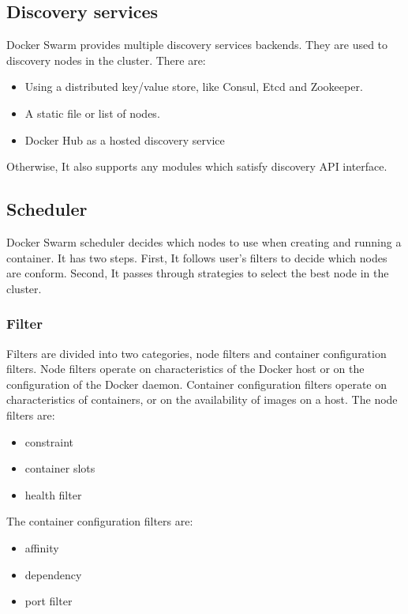 \subsection{Discovery services}
Docker Swarm provides multiple discovery services backends. They are used to discovery nodes in the cluster. There are:
\begin{itemize}
    \item Using a distributed key/value store, like Consul, Etcd and Zookeeper.
    \item A static file or list of nodes.
    \item Docker Hub as a hosted discovery service
\end{itemize}
Otherwise, It also supports any modules which satisfy discovery API interface.
\subsection{Scheduler}
Docker Swarm scheduler decides which nodes to use when creating and running a container. It has two steps. First, It follows user's filters to decide which nodes are conform. Second, It passes through strategies to select the best node in the cluster.
\subsubsection{Filter}
Filters are divided into two categories, node filters and container configuration filters. Node filters operate on characteristics of the Docker host or on the configuration of the Docker daemon. Container configuration filters operate on characteristics of containers, or on the availability of images on a host.
The node filters are:
\begin{itemize}
    \item constraint
    \item container slots
    \item health filter
\end{itemize}
The container configuration filters are:
\begin{itemize}
    \item affinity
    \item dependency
    \item port filter
\end{itemize}

